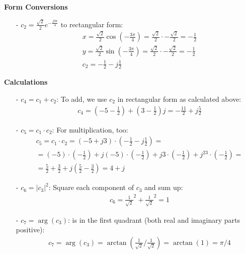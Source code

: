 
\textbf{Form Conversions}

\begin{enumerate}
\item[-]
$c_2 = \frac{\sqrt{2}}{2} e^{-\frac{j 3 \pi}{4}}$ to rectangular form:
\[
\begin{aligned}
& x = \frac{\sqrt{2}}{2} \cos({-\frac{3 \pi}{4}}) = \frac{\sqrt{2}}{2} \cdot -\frac{\sqrt{2}}{2} = -\frac{1}{2} \\
& y = \frac{\sqrt{2}}{2} \sin({-\frac{3 \pi}{4}}) = \frac{\sqrt{2}}{2} \cdot -\frac{\sqrt{2}}{2} = -\frac{1}{2} \\
& c_2 = -\frac{1}{2} - j \frac{1}{2}
\end{aligned}
\]
\end{enumerate}

\textbf{Calculations}

\begin{enumerate}
\item[-]
$c_4 = c_1 + c_2$: To add, we use $c_2$ in rectangular form as calculated above:
\[
\begin{aligned}
& c_4 = (-5 - \frac{1}{2}) + (3 - \frac{1}{2})j = -\frac{11}{2} + j \frac{5}{2}
\end{aligned}
\]
\end{enumerate}

\begin{enumerate}
\item[-]
$c_5 = c_1 \cdot c_2$: For multiplication, too:
\[
\begin{aligned}
& c_5 = c_1 \cdot c_2 = (-5+j 3) \cdot (-\frac{1}{2} - j \frac{1}{2}) = \\
& = (-5)\cdot (- \frac{1}{2})  + j(-5)\cdot(-\frac{1}{2}) + j3\cdot(-\frac{1}{2})+ j^23\cdot(-\frac{1}{2}) = \\
& = \frac{5}{2}+\frac{3}{2} +j(\frac{5}{2}-\frac{3}{2}) = 4 + j
\end{aligned}
\]
\end{enumerate}

\begin{enumerate}
\item[-]
$c_6 = |c_3|^2$: Square each component of $c_3$ and sum up:
\[
\begin{aligned}
& c_6 = \frac{1}{\sqrt{2}}^2 + \frac{1}{\sqrt{2}}^2 = 1
\end{aligned}
\]
\end{enumerate}

\begin{enumerate}
\item[-]
$c_7 = \arg(c_3)$: is in the first quadrant (both real and imaginary parts positive):
\[
\begin{aligned}
& c_7 = \arg(c_3) = \arctan\left(\frac{1}{\sqrt{2}}/\frac{1}{\sqrt{2}}\right) = \arctan(1) = \pi/4
\end{aligned}
\]
\end{enumerate}

